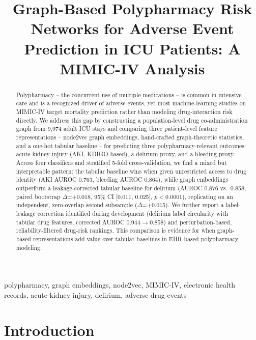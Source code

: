 \documentclass[conference]{IEEEtran}
\begin{document}
\title{Graph-Based Polypharmacy Risk Networks for Adverse Event Prediction in ICU Patients: A MIMIC-IV Analysis}

\author{
}

\maketitle

\begin{abstract}
Polypharmacy -- the concurrent use of multiple medications -- is common in
intensive care and is a recognized driver of adverse events, yet most
machine-learning studies on MIMIC-IV target mortality prediction rather than
modeling drug-interaction risk directly. We address this gap by constructing
a population-level drug co-administration graph from 9{,}974 adult ICU stays
and comparing three patient-level feature representations -- node2vec graph
embeddings, hand-crafted graph-theoretic statistics, and a one-hot tabular
baseline -- for predicting three polypharmacy-relevant outcomes: acute kidney
injury (AKI, KDIGO-based), a delirium proxy, and a bleeding proxy. Across four
classifiers and stratified 5-fold cross-validation, we find a mixed but
interpretable pattern: the tabular baseline wins when given unrestricted
access to drug identity (AKI AUROC 0.763, bleeding AUROC 0.864), while graph
embeddings outperform a leakage-corrected tabular baseline for delirium
(AUROC 0.876 vs.\ 0.858, paired bootstrap $\Delta$=+0.018, 95\% CI
[0.011, 0.025], $p<0.0001$), replicating on an independent, zero-overlap
second subsample ($\Delta$=+0.015). We further report a label-leakage
correction identified during development (delirium label circularity with
tabular drug features, corrected AUROC $0.944 \rightarrow 0.858$) and
perturbation-based, reliability-filtered drug-risk rankings. This comparison
is evidence for when graph-based representations add value over tabular
baselines in EHR-based polypharmacy modeling.
\end{abstract}

\begin{IEEEkeywords}
polypharmacy, graph embeddings, node2vec, MIMIC-IV, electronic health records, acute kidney injury, delirium, adverse drug events
\end{IEEEkeywords}

\section{Introduction}
\end{document}
